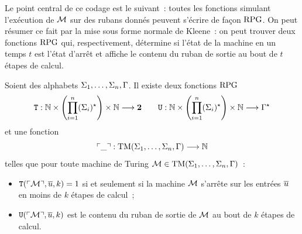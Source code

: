 Le point central de ce codage est le suivant~: toutes les fonctions simulant
l'exécution de $\mathcal{M}$ sur des rubans donnés peuvent s'écrire de façon $\operatorname{RPG}$.
On peut résumer ce fait par la mise sous forme normale de Kleene~: on peut
trouver deux fonctions $\operatorname{RPG}$ qui, respectivement, détermine si l'état de la
machine en un temps $t$ est l'état d'arrêt et affiche le contenu du ruban de
sortie au bout de $t$ étapes de calcul.

\begin{theorem}
  \label{thm.norm.Kleene}
  Soient des alphabets
  $\Sigma_1,\ldots,\Sigma_n, \Gamma$. Il existe deux fonctions $\operatorname{RPG}$
  \[
  {\normalfont\texttt{T}} : \displaystyle \mathbb N\times
    \left(\prod_{i = 1}^n(\Sigma_{i})^{\star}\right)\times\mathbb N \longrightarrow \bm{2}
  \qquad
  {\normalfont\texttt{U}} : \displaystyle \mathbb N\times\left(
    \prod_{i = 1}^n(\Sigma_{i})^{\star}\right)\times\mathbb N \longrightarrow \Gamma^{\star}\]
  et une fonction
  \[\ulcorner\mathord{\_}\urcorner : \displaystyle \operatorname{TM}(\Sigma_1,\ldots,\Sigma_n,\Gamma) \longrightarrow \mathbb N\]
  telles que pour toute machine de Turing
  $\mathcal{M} \in \operatorname{TM}(\Sigma_1,\ldots,\Sigma_n,\Gamma)$~:
  \begin{itemize}
  \item ${\normalfont\texttt{T}}(\ulcorner\mathcal{M}\urcorner,\overline{u},k) = 1$ si et seulement si la
    machine $\mathcal{M}$ s'arrête sur les entrées $\overline{u}$ en moins de
    $k$ étapes de calcul~;
  \item ${\normalfont\texttt{U}}(\ulcorner\mathcal{M}\urcorner,\overline{u},k)$ est le contenu du ruban de
    sortie de $\mathcal{M}$ au bout de $k$ étapes de calcul.
  \end{itemize}
  \index[notation]{$\KlT$}
  \index[notation]{$\KlU$}
\end{theorem}

